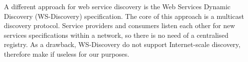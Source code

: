 A different approach for web service discovery is the Web Services Dynamic Discovery (WS-Discovery) specification. The core of this approach is a multicast discovery protocol. Service providers and consumers  listen each other for new services specifications within a network, so there is no need of a centralised registry. As a drawback, WS-Discovery do not support Internet-scale discovery, therefore make if useless for our purposes.
